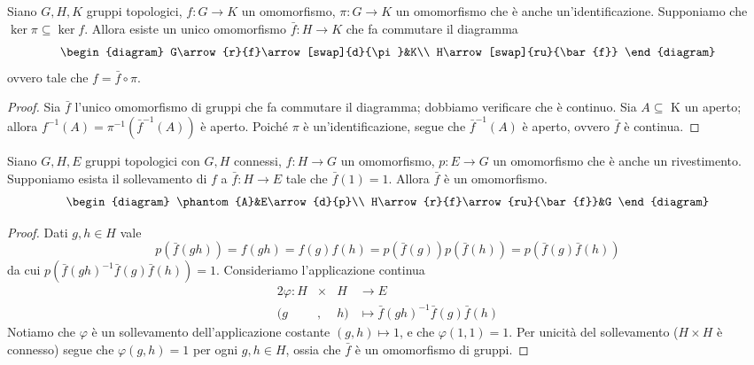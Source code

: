\begin{proposition}
Siano $G\comma H\comma K$ gruppi topologici, $f:G\to K$ un omomorfismo, $\pi:G\to K$ un omomorfismo che è anche un'identificazione. Supponiamo che $\ker\pi\subseteq\ker f$. Allora esiste un unico omomorfismo $\bar{f}:H\to K$ che fa commutare il diagramma
$$
\begin{diagram}
G\arrow{r}{f}\arrow[swap]{d}{\pi}&K\\
H\arrow[swap]{ru}{\bar{f}}
\end{diagram}
$$
ovvero tale che $f=\bar{f}\circ\pi$.
\end{proposition}
\begin{proof}
Sia $\bar{f}$ l'unico omomorfismo di gruppi che fa commutare il diagramma; dobbiamo verificare che è continuo. Sia $A\subseteq$ K un aperto; allora $f^{-1}(A)=\pi^{-1}(\bar{f}^{-1}(A))$ è aperto. Poiché $\pi$ è un'identificazione, segue che $\bar{f}^{-1}(A)$ è aperto, ovvero $\bar{f}$ è continua.
\end{proof}

\begin{proposition}
Siano $G\comma H\comma E$ gruppi topologici con $G\comma H$ connessi, $f:H\to G$ un omomorfismo, $p:E\to G$ un omomorfismo che è anche un rivestimento. Supponiamo esista il sollevamento di $f$ a $\bar{f}:H\to E$ tale che $\bar{f}(1)=1$. Allora $\bar{f}$ è un omomorfismo.
$$
\begin{diagram}
\phantom{A}&E\arrow{d}{p}\\
H\arrow{r}{f}\arrow{ru}{\bar{f}}&G
\end{diagram}
$$
\end{proposition}
\begin{proof}
Dati $g,h\in H$ vale
$$
p(\bar{f}(gh))=f(gh)=f(g)f(h)=p(\bar{f}(g))p(\bar{f}(h))=p(\bar{f}(g)\bar{f}(h))
$$
da cui $p(\bar{f}(gh)^{-1}\bar{f}(g)\bar{f}(h))=1$. Consideriamo l'applicazione continua
\begin{alignat*}{2}
\varphi:H&\times &H&\longrightarrow E\\
(g&,&h)&\longmapsto\bar{f}(gh)^{-1}\bar{f}(g)\bar{f}(h)
\end{alignat*}
Notiamo che $\varphi$ è un sollevamento dell'applicazione costante $(g,h)\mapsto 1$, e che $\varphi(1,1)=1$. Per unicità del sollevamento ($H\times H$ è connesso) segue che $\varphi(g,h)=1$ per ogni $g,h\in H$, ossia che $\bar{f}$ è un omomorfismo di gruppi.
\end{proof}

